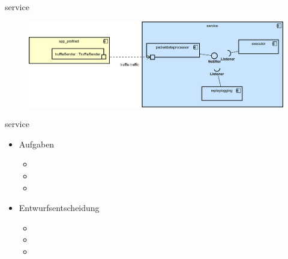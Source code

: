 \begin{frame}{service}
    \begin{figure}
    	\centering
    	\includegraphics[width=\textwidth]{./images/service.png}
    \end{figure}
\end{frame}
 \begin{frame}{service}
    \begin{itemize}[<+->]
      \item Aufgaben
        \begin{itemize}
          \item
          \item
          \item
        \end{itemize}
      \item Entwurfsentscheidung
        \begin{itemize}
          \item
          \item
          \item
        \end{itemize}
    \end{itemize}
\end{frame}